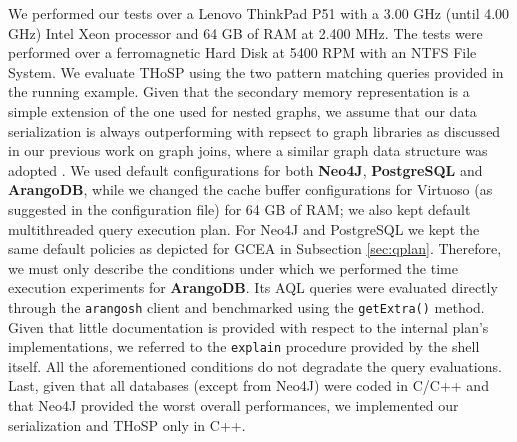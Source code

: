 We performed our tests over a Lenovo ThinkPad P51 with a 3.00 GHz (until 4.00 GHz) Intel Xeon processor and 64 GB of RAM at 2.400 MHz. The tests were performed over a ferromagnetic Hard Disk at 5400 RPM with an NTFS File System. We evaluate THoSP using the two pattern matching queries provided in the running example. Given that the secondary memory representation is a simple extension of the one used for nested graphs, we assume that our data serialization is always outperforming with repsect to graph libraries as discussed in our previous work on graph joins, where a similar graph data structure was adopted \cite{BergamiMM17}. We used default configurations for both \textbf{Neo4J}, \textbf{PostgreSQL} and \textbf{ArangoDB}, while we changed the cache buffer configurations for Virtuoso (as suggested in the configuration file) for 64 GB of RAM; we also kept  default multithreaded query execution plan. For Neo4J and PostgreSQL we kept the same default policies as depicted for  GCEA in Subsection \ref{sec:qplan}. Therefore, we must only describe the conditions under which we performed the time execution experiments for \textbf{ArangoDB}. Its AQL queries were evaluated directly through the \texttt{arangosh} client and benchmarked using the \texttt{getExtra()} method. Given that little documentation is provided with respect to the internal plan's implementations, we referred to the \texttt{explain} procedure provided by the shell itself. All the aforementioned conditions do not degradate the query evaluations. Last, given that all databases (except from Neo4J) were coded in C/C++ and that Neo4J provided the worst overall performances, we implemented our serialization and THoSP only in C++.


